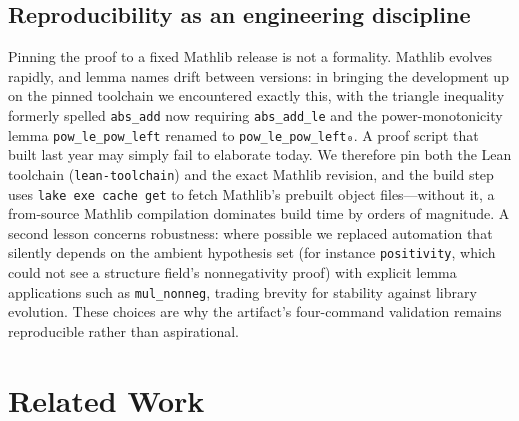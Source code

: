 \documentclass[sigplan,nonacm,screen,review]{acmart}
\begin{document}
\subsection{Reproducibility as an engineering discipline}
Pinning the proof to a fixed Mathlib release is not a formality. Mathlib evolves
rapidly, and lemma names drift between versions: in bringing the development up on
the pinned toolchain we encountered exactly this, with the triangle inequality
formerly spelled \lstinline[language=lean]|abs_add| now requiring
\lstinline[language=lean]|abs_add_le| and the power-monotonicity lemma
\lstinline[language=lean]|pow_le_pow_left| renamed to
\lstinline[language=lean]|pow_le_pow_left₀|. A proof script that built last year
may simply fail to elaborate today. We therefore pin both the Lean toolchain
(\texttt{lean-toolchain}) and the exact Mathlib revision, and the build step uses
\texttt{lake exe cache get} to fetch Mathlib's prebuilt object files---without it,
a from-source Mathlib compilation dominates build time by orders of magnitude. A
second lesson concerns robustness: where possible we replaced automation that
silently depends on the ambient hypothesis set (for instance
\lstinline[language=lean]|positivity|, which could not see a structure field's
nonnegativity proof) with explicit lemma applications such as
\lstinline[language=lean]|mul_nonneg|, trading brevity for stability against
library evolution. These choices are why the artifact's four-command validation
remains reproducible rather than aspirational.

\section{Related Work}
\label{sec:related}
\end{document}
